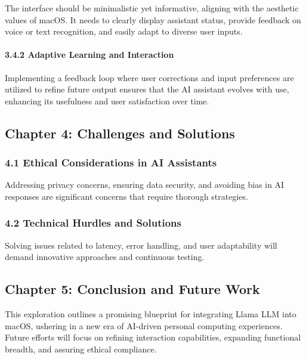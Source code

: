 The interface should be minimalistic yet informative, aligning with the
aesthetic values of macOS. It needs to clearly display assistant status,
provide feedback on voice or text recognition, and easily adapt to
diverse user inputs.

\hypertarget{adaptive-learning-and-interaction}{%
\paragraph{3.4.2 Adaptive Learning and
Interaction}\label{adaptive-learning-and-interaction}}

Implementing a feedback loop where user corrections and input
preferences are utilized to refine future output ensures that the AI
assistant evolves with use, enhancing its usefulness and user
satisfaction over time.

\hypertarget{chapter-4-challenges-and-solutions}{%
\subsection{Chapter 4: Challenges and
Solutions}\label{chapter-4-challenges-and-solutions}}

\hypertarget{ethical-considerations-in-ai-assistants}{%
\subsubsection{4.1 Ethical Considerations in AI
Assistants}\label{ethical-considerations-in-ai-assistants}}

Addressing privacy concerns, ensuring data security, and avoiding bias
in AI responses are significant concerns that require thorough
strategies.

\hypertarget{technical-hurdles-and-solutions}{%
\subsubsection{4.2 Technical Hurdles and
Solutions}\label{technical-hurdles-and-solutions}}

Solving issues related to latency, error handling, and user adaptability
will demand innovative approaches and continuous testing.

\hypertarget{chapter-5-conclusion-and-future-work}{%
\subsection{Chapter 5: Conclusion and Future
Work}\label{chapter-5-conclusion-and-future-work}}

This exploration outlines a promising blueprint for integrating Llama
LLM into macOS, ushering in a new era of AI-driven personal computing
experiences. Future efforts will focus on refining interaction
capabilities, expanding functional breadth, and assuring ethical
compliance.
